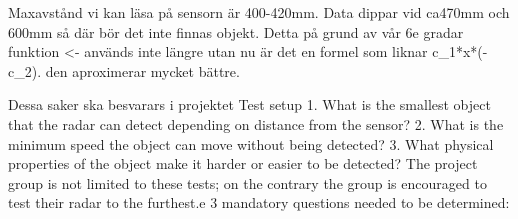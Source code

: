 Maxavstånd vi kan läsa på sensorn är 400-420mm. 
Data dippar vid ca470mm och 600mm så där bör det inte finnas objekt. Detta på grund av vår 6e gradar funktion <- används inte längre utan nu är det en formel som liknar c_1*x*(-c_2). den aproximerar mycket bättre.


Dessa saker ska besvarars i projektet
Test setup
1.
What is the smallest object that the radar can detect depending on distance from the
sensor?
2.
What is the minimum speed the object can move without being detected?
3.
What physical properties of the object make it harder or easier to be detected?
The project group is not limited to these tests; on the contrary the group is encouraged to
test their radar to the furthest.e 3 mandatory questions needed to be determined: